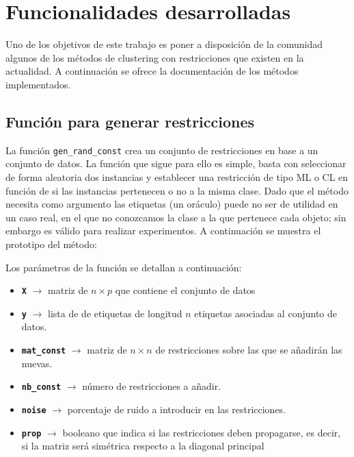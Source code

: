 \section{Funcionalidades desarrolladas}

Uno de los objetivos de este trabajo es poner a disposición de la comunidad algunos de los métodos de clustering con restricciones que existen en la actualidad. A continuación se ofrece la documentación de los métodos implementados.

\subsection{Función para generar restricciones} \label{genConst}

La función \texttt{gen\_rand\_const} crea un conjunto de restricciones en base a un conjunto de datos. La función que sigue para ello es simple, basta con seleccionar de forma aleatoria dos instancias y establecer una restricción de tipo \acs{ML} o \acs{CL} en función de si las instancias pertenecen o no a la misma clase. Dado que el método necesita como argumento las etiquetas (un oráculo) puede no ser de utilidad en un caso real, en el que no conozcamos la clase a la que pertenece cada objeto; sin embargo es válido para realizar experimentos. A continuación se muestra el prototipo del método:



Los parámetros de la función se detallan a continuación:

\begin{itemize}

	\item \textbf{\texttt{X}} {$\longrightarrow$ matriz de $n \times p$ que contiene el conjunto de datos}
	
	\item \textbf{\texttt{y}} {$\longrightarrow$ lista de de etiquetas de longitud $n$ etiquetas asociadas al conjunto de datos.}
	
	\item \textbf{\texttt{mat\_const}} {$\longrightarrow$ matriz de $n \times n$ de restricciones sobre las que se añadirán las nuevas.}
	
	\item \textbf{\texttt{nb\_const}} {$\longrightarrow$ número de restricciones a añadir.}
	
	\item \textbf{\texttt{noise}} {$\longrightarrow$ porcentaje de ruido a introducir en las restricciones.}
	
	\item \textbf{\texttt{prop}} {$\longrightarrow$ booleano que indica si las restricciones deben propagarse, es decir, si la matriz será simétrica respecto a la diagonal principal}

\end{itemize}

